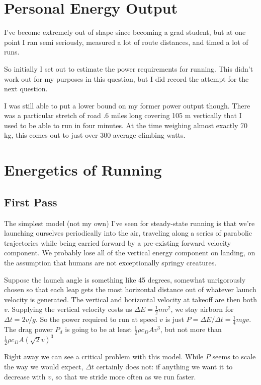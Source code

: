 \documentclass[12pt]{article}
\begin{document}
\section{Personal Energy Output}

I've become extremely out of shape since becoming a grad student, but at one point I ran semi seriously, measured a lot of route distances, and timed a lot of runs.

So initially I set out to estimate the power requirements for running. This didn't work out for my purposes in this question, but I did record the attempt for the next question.

I was still able to put a lower bound on my former power output though. There was a particular stretch of road .6 miles long covering 105 m vertically that I used to be able to run in four minutes. At the time weighing almost exactly 70 kg, this comes out to just over 300 average climbing watts.



\section{Energetics of Running}

\subsection{First Pass}

The simplest model (not my own) I've seen for steady-state running is that we're launching ourselves periodically into the air, traveling along a series of parabolic trajectories while being carried forward by a pre-existing forward velocity component. We probably lose all of the vertical energy component on landing, on the assumption that humans are not exceptionally springy creatures.

Suppose the launch angle is something like 45 degrees, somewhat unrigorously chosen so that each leap gets the most horizontal distance out of whatever launch velocity is generated. The vertical and horizontal velocity at takeoff are then both \(v\). Supplying the vertical velocity costs us \(\Delta E = \frac{1}{2}mv^2\), we stay airborn for \(\Delta t = 2v/g\). So the power required to run at speed \(v\) is just \(P = \Delta E / \Delta t=\frac{1}{4}mgv\). The drag power \(P_d\) is going to be at least \(\frac{1}{2}\rho c_D A v^3\), but not more than \(\frac{1}{2}\rho c_D A (\sqrt{2}v)^3\)

Right away we can see a critical problem with this model. While \(P\) seems to scale the way we would expect, \(\Delta t\) certainly does not: if anything we want it to decrease with \(v\), so that we stride more often as we run faster. 
\end{document}
